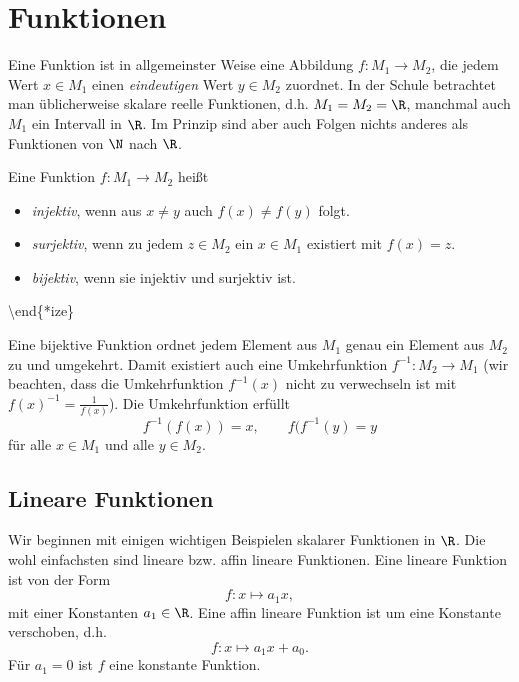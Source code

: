 \documentclass[letterpaper,10pt,english]{jupyterBook}
\begin{document}
\section{Funktionen}
\label{\detokenize{vorkurs/funktionen:funktionen}}\label{\detokenize{vorkurs/funktionen::doc}}
Eine Funktion ist in allgemeinster Weise eine Abbildung \(f: M_1 \rightarrow M_2\), die jedem Wert \(x \in M_1\) einen \emph{eindeutigen} Wert \(y \in M_2\) zuordnet. In der Schule betrachtet man üblicherweise skalare reelle Funktionen, d.h. \(M_1=M_2=\R\), manchmal auch \(M_1\) ein Intervall in \(\R\). Im Prinzip sind aber auch Folgen nichts anderes als Funktionen von \(\N\) nach \(\R\).
\label{vorkurs/funktionen:definition-0}
\begin{definition}{}{}



Eine Funktion \(f:M_1 \rightarrow M_2\) heißt
\begin{itemize}
\item {} 
\emph{injektiv}, wenn aus \(x \neq y\) auch \(f(x) \neq f(y)\) folgt.

\item {} 
\emph{surjektiv}, wenn zu jedem \(z \in M_2\) ein \(x \in M_1\) existiert mit \(f(x)=z\).

\item {} 
\emph{bijektiv}, wenn sie injektiv und surjektiv ist.

\end{itemize}

\textbackslash{}end\{*ize\}
\end{definition}

Eine bijektive Funktion ordnet jedem Element aus \(M_1\) genau ein Element aus \(M_2\) zu und umgekehrt. Damit existiert  auch eine Umkehrfunktion \(f^{-1}: M_2 \rightarrow M_1\) (wir beachten, dass die Umkehrfunktion \(f^{-1}(x)\) nicht zu verwechseln ist mit \(f(x)^{-1} = \frac{1}{f(x)}\)). Die Umkehrfunktion erfüllt
\begin{equation*}
 f^{-1}(f(x)) = x, \qquad f(f^{-1}(y) = y\end{equation*}
für alle \(x \in M_1\) und alle \(y \in M_2\).


\subsection{Lineare Funktionen}
\label{\detokenize{vorkurs/funktionen:lineare-funktionen}}
Wir beginnen mit einigen wichtigen Beispielen skalarer Funktionen in \(\R\). Die wohl einfachsten sind lineare bzw. affin lineare Funktionen. Eine lineare Funktion ist von der Form
\begin{equation*}
 f:x \mapsto a_1 x,\end{equation*}
mit einer Konstanten \(a_1 \in \R\). Eine affin lineare Funktion ist um eine Konstante verschoben, d.h.
\begin{equation*}
 f:x\mapsto a_1 x + a_0.\end{equation*}
Für \(a_1 =0\) ist \(f\) eine konstante Funktion.
\end{document}
